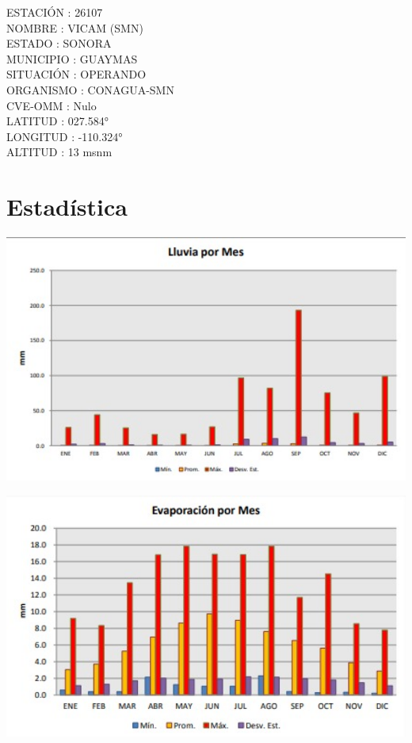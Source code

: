 \documentclass{article}
\begin{document}
ESTACIÓN  : 26107\\
NOMBRE    : VICAM (SMN)\\
ESTADO    : SONORA\\
MUNICIPIO : GUAYMAS\\
SITUACIÓN : OPERANDO\\
ORGANISMO : CONAGUA-SMN\\
CVE-OMM   : Nulo\\
LATITUD   : 027.584°\\
LONGITUD  : -110.324°\\
ALTITUD   : 13 msnm

\section{\LARGE Estadística}
\begin{figure1}
\includegraphics[width=15cm]{3.jpg} 
\end{figure1}
\newpage
\begin{figure1}
\includegraphics[width=15cm]{4.jpg} 
\end{figure1}
\end{document}
